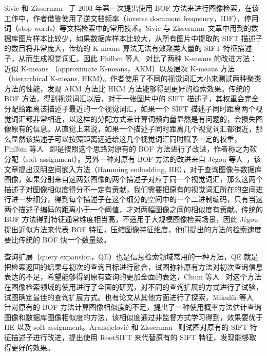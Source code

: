 Sivic 和 Zisserman~\cite{Sivic2003VideoGA} 于 2003 年第一次提出使用 BOF 方法来进行图像检索，在该工作中，作者借鉴使用了逆文档频率（inverse document frequency，IDF），停用词（stop words）等文档检索中的常用技术。Sivic 与 Zisserman~\cite{Sivic2003VideoGA}文章中用到的数据库图片样本比较少，如果数据库样本比较大，从所有图片中提取的 SIFT 描述子的数目将非常庞大，传统的 K-means 算法无法有效聚类大量的 SIFT 特征描述子，从而生成视觉词汇，因此 Philbin 等人~\cite{Philbin2007ObjectRW} 对比了两种 K-means 的改进方法：近似 K-means （approximate K-means，AKM）以及层次 K-means 方法（hierarchical K-means, HKM）。作者使用了不同的视觉词汇大小来测试两种聚类方法的性能，发现 AKM 方法比 HKM 方法能够得到更好的检索效果。传统的 BOF 方法，得到视觉词汇以后，对于一张图片中的 SIFT 描述子，其权重会完全分配给距离该描述子最近的一个视觉词汇，如果一个 SIFT 描述子同时距离两个视觉词汇都非常相近，以这样的分配方式来计算词频向量显然是有问题的，会损失图像原有的信息。从直觉上来说，如果一个描述子同时距离几个视觉词汇都很近，那么显然该描述子可以按照距离远近给这几个视觉词汇同时赋予一定的权重，Philbin 等人~\cite{Philbin2008LostIQ} 即是按照这个思路对原有的 BOF 方法进行了改进，作者称之为软分配（soft assignment）。另外一种对原有 BOF 方法的改进来自 J{\'e}gou 等人~\cite{Jgou2008HammingEA}，该文章提出汉明空间嵌入方法（Hamming embedding, HE），对于查询图像与数据库图像，如果分别来自这两张图像的两个描述子对应于同一个视觉词汇，那么这两个描述子对图像相似度得分不一定有贡献，我们需要把原有的视觉词汇所在的空间进行进一步细分，得到每个描述子在这个细分的空间中的一个二进制编码，只有当这两个描述子编码的距离小于一个阈值，才对两幅图像之间的相似度有贡献。传统的 BOF 方法得到特征通常维度相当高，不适用于大规模图像检索场景，因此 J{\'e}gou~\cite{Jgou2009PackingB} 提出近似方法来代表 BOF 特征，压缩图像特征维度，他们提出的方法的检索速度要比传统的 BOF 快一个数量级。

查询扩展（query expansion，QE）也是信息检索领域常用的一种方法，QE 就是把检索返回的结果与初次的查询目标进行融合，试图弥补原有方法对初次查询信息表达的不足，希望能够得到原有查询的更加全面的表达，Chum 等人~\cite{Chum2007TotalRA} 对这个方法在图像检索领域的使用进行了全面的研究，对不同的查询扩展的方式进行了试验，试图确定最佳的查询扩展方式。也有论文从其他方面进行了探索，Mikulík 等人~\cite{Mikulk2010LearningAF} 针对原有的 BOF 方法计算图像相似度的不足，提出了一种使用概率方法估计查询图像和数据库图像相似度的方法，该相似度通过非监督方式学习得到，效果要优于 HE 以及 soft assignment。Arandjelovi{\'c} 和 Zisserman~\cite{Arandjelovic2012ThreeTE} 则试图对原有的 SIFT 特征描述子进行改进，提出使用 RootSIFT 来代替原有的 SIFT 特征，发现能够取得更好的效果。

